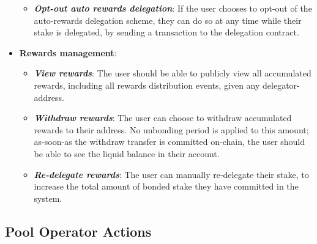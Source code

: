 \begin{itemize}
\begin{itemize}
        \item \textit{\textbf{Opt-out auto rewards delegation}}: If the user chooses to opt-out of the auto-rewards delegation scheme, they can do so at any time while their stake is delegated, by sending a transaction to the delegation contract.  
    \end{itemize}
    \item \textbf{Rewards management}: 
    \begin{itemize}
        \item \textit{\textbf{View rewards}}: The user should be able to publicly view all accumulated rewards, including all rewards distribution events, given any delegator-address.  
        \item \textit{\textbf{Withdraw rewards}}: The user can choose to withdraw accumulated rewards to their address. No unbonding period is applied to this amount; as-soon-as the withdraw transfer is committed on-chain, the user should be able to see the liquid balance in their account. 
        \item \textit{\textbf{Re-delegate rewards}}: The user can manually re-delegate their stake, to increase the total amount of bonded stake they have committed in the system.   
    \end{itemize}
\end{itemize}

\subsection{Pool Operator Actions} \label{pool_actions}

